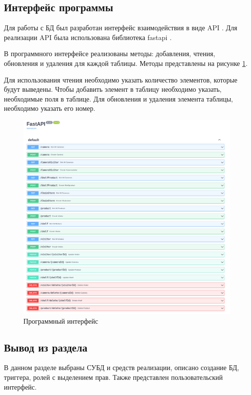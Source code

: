 \subsection{Интерфейс программы}

Для работы с БД был разработан интерфейс взаимодействия в виде API \cite{API}.
Для реализации API была использована библиотека fastapi \cite{fastapi}.

В программного интерфейсе реализованы методы: добавления, чтения, обновления и
удаления для каждой таблицы.
Методы представлены на рисунке \ref{fig:api}.

Для использования чтения необходимо указать количество элементов, которые будут
выведены.
Чтобы добавить элемент в таблицу необходимо указать, необходимые поля в
таблице.
Для обновления и удаления элемента таблицы, необходимо указать его номер.

\begin{figure}[ht!]
    \centering
    \includegraphics[width=1\linewidth]{assets/images/api.png}
    \caption{Программный интерфейс}
    \label{fig:api}
\end{figure}
\FloatBarrier

\subsection{Вывод из раздела}

В данном разделе выбраны СУБД и средств реализации, описано создание БД,
триггера, ролей с выделением прав.
Также представлен пользовательский интерфейс.